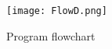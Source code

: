 \begin{figure}[ht]
	\centering
	\texttt{[image: FlowD.png]}
	\caption{Program flowchart}
	
	\label{fig:program_flowchart}
\end{figure}

